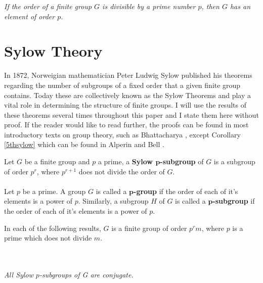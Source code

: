 \begin{theorem}\label{cauchy} \textit{If the order of a finite group $G$ is divisible by a prime number $p$, then $G$ has an element of order $p$.} \\
\end{theorem} 

\section{Sylow Theory}

In 1872, Norweigian mathematician Peter Ludwig Sylow published his theorems regarding the number of subgroups of a fixed order that a given finite group contains. Today these are collectively known as the Sylow Theorems and play a vital role in determining the structure of finite groups. I will use the results of these theorems several times throughout this paper and I state them here without proof. If the reader would like to read further, the proofs can be found in most introductory texts on group theory, such as Bhattacharya \cite{bhattacharya}, except Corollary \ref{5thsylow} which can be found in Alperin and Bell \cite[p.64]{alperin} . \\

\begin{definition} Let $G$ be a finite group and $p$ a prime, a \textbf{Sylow $\pmb{p}$-subgroup} of $G$ is a subgroup of order $p^r$, where $p^{r+1}$ does not divide the order of $G$. \\
\\
Let $p$ be a prime. A group $G$ is called a \textbf{$\pmb{p}$-group} if the order of each of it's elements is a power of $p$. Similarly, a subgroup $H$ of $G$ is called a \textbf{$\pmb{p}$-subgroup} if the order of each of it's elements is a power of $p$.
\end{definition}

In each of the following results, $G$ is a finite group of order $p^r m$, where $p$ is a prime which does not divide $m$. \\
\\
 \\

\begin{2ndsylow} \textit{All Sylow $p$-subgroups of G are conjugate.} \\
\end{2ndsylow}

